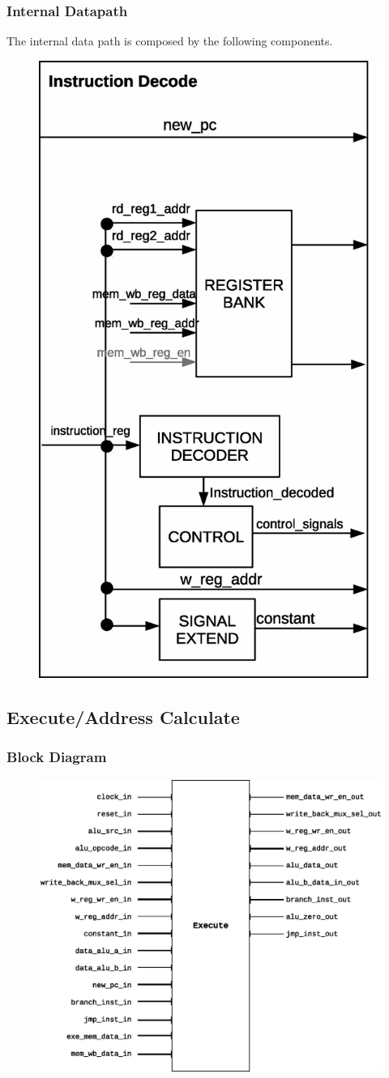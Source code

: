 \documentclass{article}
\begin{document}
  \subsubsection{Internal Datapath} 
  The internal data path is composed by the following components.

  \begin{figure}[H]
    \centering
    \includegraphics[width=0.45\linewidth]{pictures/datapath/id_datapath.eps}
  \end{figure} 
  
  
  \newpage
  \subsection{Execute/Address Calculate}
  \subsubsection{Block Diagram}
  \begin{figure}[H]
    \centering
    \includegraphics[width=\linewidth]{pictures/blocks/ex_block.eps}
  \end{figure} 
\end{document}
